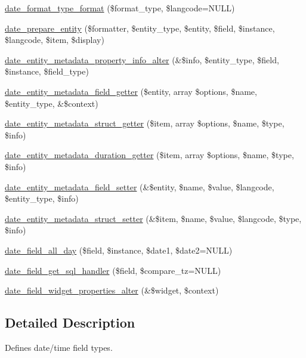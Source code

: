\begin{DoxyCompactItemize}
\item 
\hyperlink{date_8module_a312afe2762238ca96afc11ea85b88dfd}{date\_\-format\_\-type\_\-format} (\$format\_\-type, \$langcode=NULL)
\item 
\hyperlink{date_8module_a39cd033956c5dc51331bad9eb2cebd81}{date\_\-prepare\_\-entity} (\$formatter, \$entity\_\-type, \$entity, \$field, \$instance, \$langcode, \$item, \$display)
\item 
\hyperlink{date_8module_a16e6d6583949a1efc1c2bd37dec9dd4c}{date\_\-entity\_\-metadata\_\-property\_\-info\_\-alter} (\&\$info, \$entity\_\-type, \$field, \$instance, \$field\_\-type)
\item 
\hyperlink{date_8module_a8cceacd7fa3a46c19a8daae0dd3379a7}{date\_\-entity\_\-metadata\_\-field\_\-getter} (\$entity, array \$options, \$name, \$entity\_\-type, \&\$context)
\item 
\hyperlink{date_8module_a59fadd336a80f44f79cab03888e72950}{date\_\-entity\_\-metadata\_\-struct\_\-getter} (\$item, array \$options, \$name, \$type, \$info)
\item 
\hyperlink{date_8module_ac9eff22b4b527da84cfdc74552130fe2}{date\_\-entity\_\-metadata\_\-duration\_\-getter} (\$item, array \$options, \$name, \$type, \$info)
\item 
\hyperlink{date_8module_ab72347a0a3b46235078025636bcabc78}{date\_\-entity\_\-metadata\_\-field\_\-setter} (\&\$entity, \$name, \$value, \$langcode, \$entity\_\-type, \$info)
\item 
\hyperlink{date_8module_a0f666620a7ddc90ff3480c637fda8f30}{date\_\-entity\_\-metadata\_\-struct\_\-setter} (\&\$item, \$name, \$value, \$langcode, \$type, \$info)
\item 
\hyperlink{date_8module_a4432aec91a1a568280bd83cc206656c7}{date\_\-field\_\-all\_\-day} (\$field, \$instance, \$date1, \$date2=NULL)
\item 
\hyperlink{date_8module_add73c8c0d356b03c045b53a19283df11}{date\_\-field\_\-get\_\-sql\_\-handler} (\$field, \$compare\_\-tz=NULL)
\item 
\hyperlink{date_8module_afe34456f5b7c190e42133c211d76b42e}{date\_\-field\_\-widget\_\-properties\_\-alter} (\&\$widget, \$context)
\end{DoxyCompactItemize}


\subsection{Detailed Description}
Defines date/time field types. 

